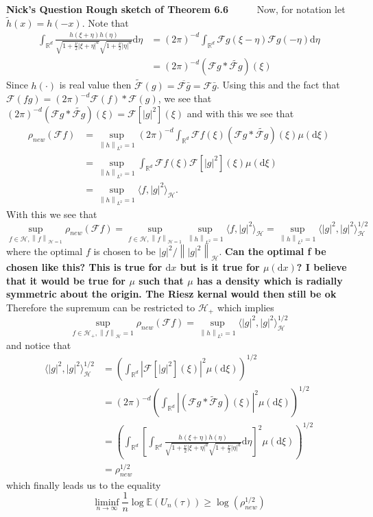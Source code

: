 \documentclass[a4paper,11pt]{article}
\numberwithin{equation}{section}
\theoremstyle{plain}
\theoremstyle{definition}
\newcommand{\ud}{\ensuremath{\mathrm{d} }}
\newcommand{\Norm}[1]{\left\|  #1   \right\|}
\newcommand{\R}{\mathbb{R}}
\newcounter{NQ}
\newenvironment{NickQuestion}[1][] %
{\refstepcounter{NQ}
	\begin{mdframed}[backgroundcolor=lightgray]\textbf{Nick's Question \theNQ \: #1~~}~~~\noindent}%
	{\end{mdframed}}
\numberwithin{NQ}{section}
\numberwithin{LQ}{section}
\numberwithin{ZQ}{section}
\begin{document}
\begin{NickQuestion}[Rough sketch of Theorem 6.6]
		Now, for notation let $\tilde{h}(x) = h(-x)$. Note that
		\begin{align*}
		\int_{\R^d} \frac{h(\xi + \eta)h(\eta)}{\sqrt{1+\frac{\nu}{2}|\xi+\eta|^a}\sqrt{1+\frac{\nu}{2}|\eta|^a}}  \ud \eta&= (2\pi)^{-d}\int_{\R^d} \mathcal{F}g(\xi-\eta)\mathcal{F}g(-\eta) \ud \eta
		\\& =(2\pi)^{-d} (\mathcal{F}g*\widetilde{\mathcal{F}g})(\xi)
		\end{align*}
		Since $h(\cdot)$ is real value then $\widetilde{\mathcal{F}}(g) = \overline{\mathcal{F}\bar{g}}= \mathcal{F}\bar{g} $. Using this and the fact that  $\mathcal{F}(fg) = (2\pi)^{-d}\mathcal{F}(f)*\mathcal{F}(g)$, we see that $(2\pi)^{-d}(\mathcal{F}g*\widetilde{\mathcal{F}g})(\xi) =\mathcal{F}\left[|g|^2\right](\xi) $ and with this we see that
		\begin{align*}
		\rho_{new}(\mathcal{F}f) &= \sup_{\Norm{h}_{L^2}=1}(2\pi)^{-d} \int_{\R^d}\mathcal{F}f(\xi)(\mathcal{F}g*\widetilde{\mathcal{F}g})(\xi) \mu(\ud \xi)
		\\&= \sup_{\Norm{h}_{L^2}=1} \int_{\R^d}\mathcal{F}f(\xi)\mathcal{F}[|g|^2](\xi) \mu(\ud \xi)
		\\&= \sup_{\Norm{h}_{L^2}=1}\langle f, |g|^2 \rangle _{\mathcal{H}}.
		\end{align*}
		With this we see that
		\[
		\sup_{ f\in \mathcal{H}, \Norm{f}_{\mathcal{H}=1} } \rho_{new}(\mathcal{F}f) = 	\sup_{ f\in \mathcal{H}, \Norm{f}_{\mathcal{H}=1} }\sup_{\Norm{h}_{L^2}=1} \langle f, |g|^2 \rangle _{\mathcal{H}} = \sup_{\Norm{h}_{L^2}=1} \langle |g|^2, |g|^2 \rangle^{1/2} _{\mathcal{H}}
		\]
		where the optimal $f$ is chosen to be $|g|^2/\Norm{|g|^2}_{\mathcal{H}}$. \textbf{Can the optimal f be chosen like this? This is true for $\ud x$ but is it true for $\mu(\ud x)$? I believe that it would be true for $\mu$ such that $\mu$ has a density which is radially symmetric about the origin. The Riesz kernal would then still be ok} Therefore the supremum can be restricted to $\mathcal{H_+}$ which implies
		\[
		\sup_{ f \in \mathcal{H}_+, \Norm{f}_{\mathcal{H}}=1 } \rho_{new}(\mathcal{F}f) = \sup_{\Norm{h}_{L^2}=1} \langle |g|^2, |g|^2 \rangle^{1/2} _{\mathcal{H}}
		\]
		and notice that
		\begin{align*}
		\langle |g|^2, |g|^2 \rangle^{1/2} _{\mathcal{H}} &= \left( \int_{\R^d} \left|\mathcal{F}[|g|^2](\xi)\right|^2 \mu(\ud \xi) \right)^{1/2}
		\\&= (2\pi)^{-d} \left( \int_{\R^d}\left| (\mathcal{F}g*\widetilde{\mathcal{F}}g)(\xi)\right|^2 \mu(\ud \xi) \right)^{1/2}
		\\&=  \left(\int_{\R^d}\left[ \int_{\R^d} \frac{h(\xi + \eta)h(\eta)}{\sqrt{1+\frac{\nu}{2}|\xi+\eta|^a}\sqrt{1+\frac{\nu}{2}|\eta|^a}}  \ud \eta \right]^2 \mu(\ud \xi) \right)^{1/2}
		\\& = \rho_{new}^{1/2}
		\end{align*}
		which finally leads us to the equality
		\[
		\liminf_{n\to \infty} \frac{1}{n} \log \mathbb{E} (U_n(\tau) ) \ge \log(\rho_{new}^{1/2})
		\]
	\end{NickQuestion}
\end{document}
